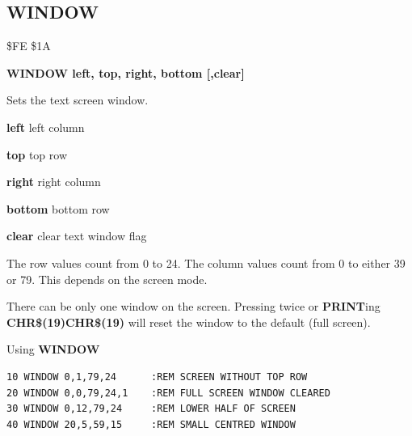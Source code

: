 \subsection{WINDOW}
\begin{description}[leftmargin=2cm,style=nextline]
\item [Token:] \$FE \$1A
\item [Format:] {\bf WINDOW left, top, right, bottom [,clear]}
\item [Usage:] Sets the text screen window.

                 {\bf left} left column

                 {\bf top} top row

                 {\bf right} right column

                 {\bf bottom} bottom row

                 {\bf clear} clear text window flag

\item [Remarks:] The row values count from 0 to 24.
                 The column values count from 0 to either 39 or 79.
                 This depends on the screen mode.

                 There can be only one window on the screen.
                 Pressing  twice or {\bf PRINT}ing
                 {\bf CHR\$(19)CHR\$(19)} will reset the window
                 to the default (full screen).

\item [Example:] Using {\bf WINDOW}
\begin{tcolorbox}[colback=black,coltext=white]
\verbatimfont{\codefont}
\begin{verbatim}
10 WINDOW 0,1,79,24      :REM SCREEN WITHOUT TOP ROW
20 WINDOW 0,0,79,24,1    :REM FULL SCREEN WINDOW CLEARED
30 WINDOW 0,12,79,24     :REM LOWER HALF OF SCREEN
40 WINDOW 20,5,59,15     :REM SMALL CENTRED WINDOW
\end{verbatim}
\end{tcolorbox}
\end{description}


\newpage
